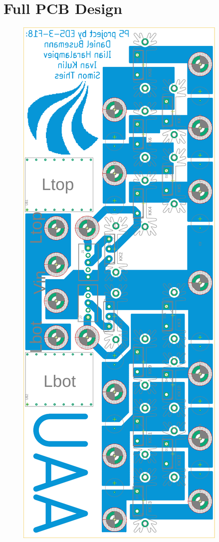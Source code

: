 \chapter{Full PCB Design}
\label{app:LTSpice}
\begin{figure}[H]
	\centering
	\includegraphics[height = 0.8\textheight, keepaspectratio]{figures/05cPCBDesign/FULL_3level_2NX_interleaved_boost_converter.pdf}
\end{figure}